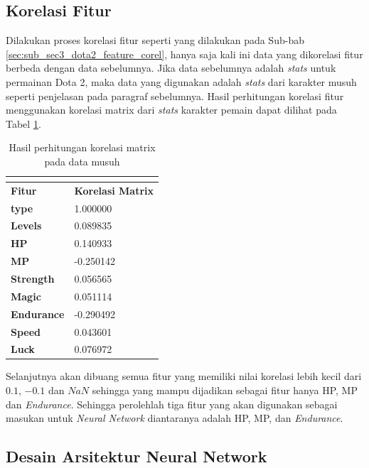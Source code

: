 \subsection{Korelasi Fitur}
\label{sec:sub_sec3_enemy_feature_corel}
\vspace{1ex}

Dilakukan proses korelasi fitur seperti yang dilakukan pada Sub-bab \ref{sec:sub_sec3_dota2_feature_corel}, hanya saja kali ini data yang dikorelasi fitur berbeda dengan data sebelumnya. Jika data sebelumnya adalah \textit{stats} untuk permainan Dota 2, maka data yang digunakan adalah \textit{stats} dari karakter musuh seperti penjelasan pada paragraf sebelumnya. Hasil perhitungan korelasi fitur menggunakan korelasi matrix dari \textit{stats} karakter pemain dapat dilihat pada Tabel \ref{tb:enemy_matrix_corel}.
\vspace{-1ex}

\begin{longtable}{|l|l|}
	\caption{Hasil perhitungan korelasi matrix pada data musuh}
	\vspace{1ex}
	\label{tb:enemy_matrix_corel}\\
	\hline
	\rowcolor[HTML]{C0C0C0}
	\textbf{Fitur} & \textbf{Korelasi Matrix} \\ \hline
	\textbf{type} & 1.000000 \\ \hline
	\textbf{Levels} & 0.089835 \\ \hline
	\textbf{HP} & 0.140933 \\ \hline
	\textbf{MP} & -0.250142 \\ \hline
	\textbf{Strength} & 0.056565 \\ \hline
	\textbf{Magic} & 0.051114 \\ \hline
	\textbf{Endurance} & -0.290492 \\ \hline
	\textbf{Speed} & 0.043601 \\ \hline
	\textbf{Luck} & 0.076972 \\ \hline
\end{longtable}

Selanjutnya akan dibuang semua fitur yang memiliki nilai korelasi lebih kecil dari $0.1$, $-0.1$ dan $NaN$ sehingga yang mampu dijadikan sebagai fitur hanya HP, MP dan \textit{Endurance}. Sehingga perolehlah tiga fitur yang akan digunakan sebagai masukan untuk \textit{Neural Network} diantaranya adalah HP, MP, dan \textit{Endurance}.
\vspace{1ex}

\subsection{Desain Arsitektur Neural Network}
\label{sec:sub_sec3_enemy_arch}
\vspace{1ex}

